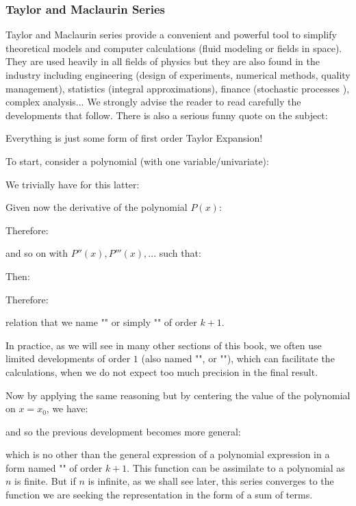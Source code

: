 	\subsubsection{Taylor and Maclaurin Series}\label{taylor series}
	Taylor and Maclaurin series provide a convenient and powerful tool to simplify theoretical models and computer calculations (fluid modeling or fields in space). They are used heavily in all fields of physics but they are also found in the industry including engineering (design of experiments, numerical methods, quality management), statistics (integral approximations), finance (stochastic processes ), complex analysis... We strongly advise the reader to read carefully the developments that follow. There is also a serious funny quote on the subject:
	\begin{fquote}Everything is just some form of first order Taylor Expansion!\end{fquote}
	To start, consider a polynomial (with one variable/univariate):
	
	We trivially have for this latter:
	
	Given now the derivative of the polynomial $P (x)$:
	
	Therefore:
	
	and so on with $P''(x), P'''(x), ...$ such that:
	
	Then:
	
	Therefore:
	
	relation that we name "" or simply "" of order $k + 1$.
	\begin{tcolorbox}[title=Remark,colframe=black,arc=10pt]
	In practice, as we will see in many other sections of this book, we often use limited developments of order $1$ (also named "", or ""), which can facilitate the calculations, when we do not expect too much precision in the final result.
	\end{tcolorbox}
	Now by applying the same reasoning but by centering the value of the polynomial on $x=x_0$, we have:
	
	and so the previous development becomes more general:
	
	which is no other than the general expression of a polynomial expression in a form named "" of order $k + 1$. This function can be assimilate to a polynomial as $n$ is finite. But if $n$ is infinite, as we shall see later, this series converges to the function we are seeking the representation in the form of a sum of terms.
	

